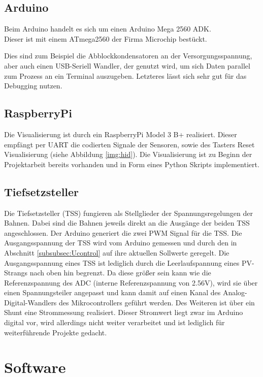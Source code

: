 \documentclass[a4paper, 11pt]{report}
\begin{document}
	\section{Arduino}
		Beim Arduino handelt es sich um einen Arduino Mega 2560 ADK.\\
		Dieser ist mit einem ATmega2560 der Firma Microchip bestückt.

		Dies sind zum Beispiel die Abblockkondensatoren an der Versorgungsspannung, aber auch einen USB-Seriell Wandler, der genutzt wird, um sich Daten parallel zum Prozess an ein Terminal auszugeben.
		Letzteres lässt sich sehr gut für das Debugging nutzen.

	\section{RaspberryPi}
		Die Visualisierung ist durch ein RaspberryPi Model 3 B+ realisiert. Dieser empfängt per UART die codierten Signale der Sensoren, sowie des Tasters \glqq Reset Visualisierung\grqq{} (siehe Abbildung \ref{img:hid}).
		Die Visualisierung ist zu Beginn der Projektarbeit bereits vorhanden und in Form eines Python Skripts implementiert.
	\section{Tiefsetzsteller}
		Die Tiefsetzsteller (TSS) fungieren als Stellglieder der Spannungsregelungen der Bahnen.
		Dabei sind die Bahnen jeweils direkt an die Ausgänge der beiden TSS angeschlossen.
	  Der Arduino generiert die zwei PWM Signal für die TSS.
		Die Ausgangsspannung der TSS wird vom Arduino gemessen und durch den in Abschnitt \ref{subsubsec:Ucontrol} auf ihre aktuellen Sollwerte geregelt.
		Die Ausgangsspannung eines TSS ist lediglich durch die Leerlaufspannung eines PV-Strangs %
		nach oben hin begrenzt.
		Da diese größer sein kann wie die Referenzspannung des ADC (interne Referenzspannung von 2.56V), wird sie über einen Spannungsteiler angepasst und kann damit auf einen Kanal des Analog-Digital-Wandlers des Mikrocontrollers geführt werden.
		Des Weiteren ist über ein Shunt eine Strommessung realisiert.
		Dieser Stromwert liegt zwar im Arduino digital vor, wird allerdings nicht weiter
		verarbeitet und ist lediglich für weiterführende Projekte gedacht.

\chapter{Software}
\end{document}
